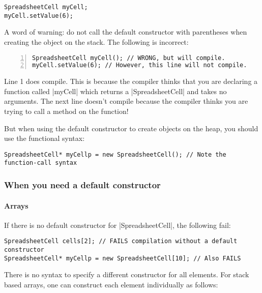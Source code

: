 \documentclass[a4paper,12pt,oneside]{book}
\begin{document}
{\begin{lstlisting}
SpreadsheetCell myCell;
myCell.setValue(6);
\end{lstlisting}

A word of warning: do not call the default constructor with parentheses when creating the object on the stack. The following is incorrect:

\begin{lstlisting}[numbers=left]
SpreadsheetCell myCell(); // WRONG, but will compile.
myCell.setValue(6); // However, this line will not compile.
\end{lstlisting}

Line 1 does compile. This is because the compiler thinks that you are declaring a function called \lst|myCell| which returns a \lst|SpreadsheetCell| and takes no arguments. The next line doesn't compile because the compiler thinks you are trying to call a method on the function!
\vspace{\baselineskip}
\begin{center}
  \noindent{}
\end{center}
\vspace{\baselineskip}
But when using the default constructor to create objects on the heap, you should use the functional syntax:

\begin{lstlisting}
SpreadsheetCell* myCellp = new SpreadsheetCell(); // Note the function-call syntax
\end{lstlisting}

\subsubsection{When you need a default constructor}
\paragraph{Arrays}
If there is no default constructor for \lst|SpreadsheetCell|, the following fail:

\begin{lstlisting}
SpreadsheetCell cells[2]; // FAILS compilation without a default constructor
SpreadsheetCell* myCellp = new SpreadsheetCell[10]; // Also FAILS
\end{lstlisting}

There is no syntax to specify a different constructor for all elements. For stack based arrays, one can construct each element individually as follows:

}
\end{document}
